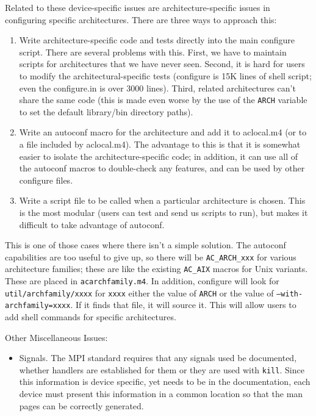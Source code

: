\documentclass{article}
\let\file=\texttt
\let\code=\texttt
\begin{document}
Related to these device-specific issues are architecture-specific issues in
configuring specific architectures.  There are three ways to approach this:
\begin{enumerate}
\item Write architecture-specific code and tests directly into the main
  configure script.  There are several problems with this.  First, we have to
  maintain scripts for architectures that we have never seen.  Second, it is
  hard for users to modify the architectural-specific tests (configure is 15K
  lines of shell script; even the configure.in is over 3000 lines).  Third, 
  related architectures can't share the same code (this is made even worse by
  the use of the \texttt{ARCH} variable to set the default library/bin
  directory paths).
\item Write an autoconf macro for the architecture and add it to aclocal.m4
  (or to a file included by aclocal.m4).  The advantage to this is that 
  it is somewhat easier to isolate the architecture-specific code; in
  addition, it can use all of the autoconf macros to double-check any
  features, and can be used by other configure files.  
\item Write a script file to be called when a particular architecture is
  chosen.  This is the most modular (users can test and send us scripts to
  run), but makes it difficult to take advantage of autoconf.  
\end{enumerate}
This is one of those cases where there isn't a simple solution.  The autoconf
capabilities are too useful to give up, so there will be \code{AC\_ARCH\_xxx}
for various architecture families; these are like the existing \code{AC\_AIX}
macros for Unix variants.  These are placed in \file{acarchfamily.m4}. 
In addition, configure will look for
\file{util/archfamily/xxxx} for \code{xxxx} either the value of \code{ARCH} or
the value of \code{--with-archfamily=xxxx}.  If it finds that file, it will
source it.  This will allow users to add shell commands for specific
architectures. 

Other Miscellaneous Issues:
\begin{itemize}
\item Signals.  The MPI standard requires that any signals used be
  documented, whether handlers are established for them or they are used with
  \code{kill}.  Since this information is device specific, yet needs to be in
  the documentation, each device must present this information in a common
  location so that the man pages can be correctly generated.
\end{itemize}
\end{document}
